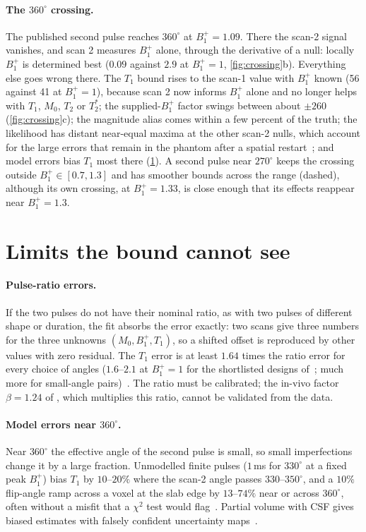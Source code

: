 \documentclass[11pt]{article}
\newcommand{\Bone}{B_1^{+}}
\newcommand{\Tone}{T_1}
\newcommand{\Ttwo}{T_2}
\newcommand{\Ttwos}{T_2^{*}}
\newcommand{\Mzero}{M_0}
\begin{document}
\paragraph{The $360^\circ$ crossing.} The published second pulse reaches $360^\circ$ at $\Bone=1.09$. There the
scan-2 signal vanishes, and scan 2 measures $\Bone$ alone, through the derivative of a null: locally
$\Bone$ is determined best ($0.09$ against $2.9$ at $\Bone=1$, \cref{fig:crossing}b). Everything else goes wrong
there. The $\Tone$ bound rises to the scan-1 value with $\Bone$ known (56 against 41 at $\Bone=1$), because scan 2
now informs $\Bone$ alone and no longer helps with $\Tone$, $\Mzero$, $\Ttwo$ or $\Ttwos$; the supplied-$\Bone$ factor swings
between about $\pm260$ (\cref{fig:crossing}c); the magnitude alias comes within a few percent of the truth;
the likelihood has distant near-equal maxima at the other scan-2 nulls, which account for the large
errors that remain in the phantom after a spatial restart~\cite[Secs.~7 and~9]{technote}; and model
errors bias $\Tone$ most there (\cref{sec:invisible}). A second pulse near $270^\circ$ keeps the crossing outside
$\Bone\in[0.7,1.3]$ and has smoother bounds across the range (dashed), although its own crossing, at
$\Bone=1.33$, is close enough that its effects reappear near $\Bone=1.3$.

\section{Limits the bound cannot see}\label{sec:invisible}

\paragraph{Pulse-ratio errors.} If the two pulses do not have their nominal ratio, as with two pulses
of different shape or duration, the fit absorbs the error exactly: two scans give three numbers for
the three unknowns $(\Mzero,\Bone,\Tone)$, so a shifted offset is reproduced by other values with zero
residual. The $\Tone$ error is at least $1.64$ times the ratio error for every choice of angles ($1.6$--$2.1$ at $\Bone=1$
for the shortlisted designs of~\cite[Table~2]{flipnote}; much more for small-angle pairs)~\cite[Prop.~4]{flipnote}. The ratio must be calibrated; the in-vivo factor $\beta=1.24$ of
\cite{cheng2019}, which multiplies this ratio, cannot be validated from the data.

\paragraph{Model errors near $360^\circ$.} Near $360^\circ$ the effective angle of the second pulse is small, so
small imperfections change it by a large fraction. Unmodelled finite pulses ($1$\,ms for $330^\circ$ at a
fixed peak $\Bone$) bias $\Tone$ by $10$--$20\%$ where the scan-2 angle passes $330$--$350^\circ$, and a $10\%$ flip-angle ramp
across a voxel at the slab edge by $13$--$74\%$ near or across $360^\circ$, often without a misfit that a $\chi^2$
test would flag~\cite[Sec.~6]{flipnote}. Partial volume with CSF gives
biased estimates with falsely confident uncertainty maps~\cite[Sec.~10]{technote}.
\end{document}
